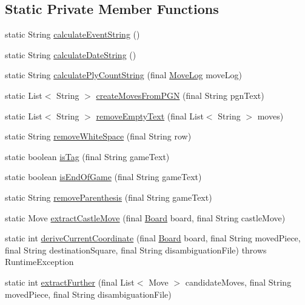 \subsection*{Static Private Member Functions}
\begin{DoxyCompactItemize}
\item 
static String \mbox{\hyperlink{classcom_1_1chess_1_1pgn_1_1_p_g_n_utilities_a438ea875a710fa38af8fc53baabb7f35}{calculate\+Event\+String}} ()
\item 
static String \mbox{\hyperlink{classcom_1_1chess_1_1pgn_1_1_p_g_n_utilities_af7992c0af1afb2451cb5b0cb5d44fe14}{calculate\+Date\+String}} ()
\item 
static String \mbox{\hyperlink{classcom_1_1chess_1_1pgn_1_1_p_g_n_utilities_ae9d14a2c35460d0431bb747bc2c173b5}{calculate\+Ply\+Count\+String}} (final \mbox{\hyperlink{classcom_1_1chess_1_1gui_1_1_table_1_1_move_log}{Move\+Log}} move\+Log)
\item 
static List$<$ String $>$ \mbox{\hyperlink{classcom_1_1chess_1_1pgn_1_1_p_g_n_utilities_a1fb2c034691cba7ae8ca4566c708d2e8}{create\+Moves\+From\+P\+GN}} (final String pgn\+Text)
\item 
static List$<$ String $>$ \mbox{\hyperlink{classcom_1_1chess_1_1pgn_1_1_p_g_n_utilities_ad4c58c09639d5b0a542ec2abe7c7447d}{remove\+Empty\+Text}} (final List$<$ String $>$ moves)
\item 
static String \mbox{\hyperlink{classcom_1_1chess_1_1pgn_1_1_p_g_n_utilities_a8f5b3f1cad30ac4052ba7d2959c994f4}{remove\+White\+Space}} (final String row)
\item 
static boolean \mbox{\hyperlink{classcom_1_1chess_1_1pgn_1_1_p_g_n_utilities_a2fb5aa9a10980e7e1546c724ea5c90ff}{is\+Tag}} (final String game\+Text)
\item 
static boolean \mbox{\hyperlink{classcom_1_1chess_1_1pgn_1_1_p_g_n_utilities_a4d719226070370ffee5c7380f9846318}{is\+End\+Of\+Game}} (final String game\+Text)
\item 
static String \mbox{\hyperlink{classcom_1_1chess_1_1pgn_1_1_p_g_n_utilities_a6d2391cc5e62da73e9aacdd00f16a104}{remove\+Parenthesis}} (final String game\+Text)
\item 
static Move \mbox{\hyperlink{classcom_1_1chess_1_1pgn_1_1_p_g_n_utilities_ab0ec9ee8e61704120d3e5cf5c36deb45}{extract\+Castle\+Move}} (final \mbox{\hyperlink{classcom_1_1chess_1_1engine_1_1classic_1_1board_1_1_board}{Board}} board, final String castle\+Move)
\item 
static int \mbox{\hyperlink{classcom_1_1chess_1_1pgn_1_1_p_g_n_utilities_a5024493209a3d6567e24b0faa53cec6e}{derive\+Current\+Coordinate}} (final \mbox{\hyperlink{classcom_1_1chess_1_1engine_1_1classic_1_1board_1_1_board}{Board}} board, final String moved\+Piece, final String destination\+Square, final String disambiguation\+File)  throws Runtime\+Exception 
\item 
static int \mbox{\hyperlink{classcom_1_1chess_1_1pgn_1_1_p_g_n_utilities_a92202124e617f80bcf023005c5310d55}{extract\+Further}} (final List$<$ Move $>$ candidate\+Moves, final String moved\+Piece, final String disambiguation\+File)
\end{DoxyCompactItemize}
